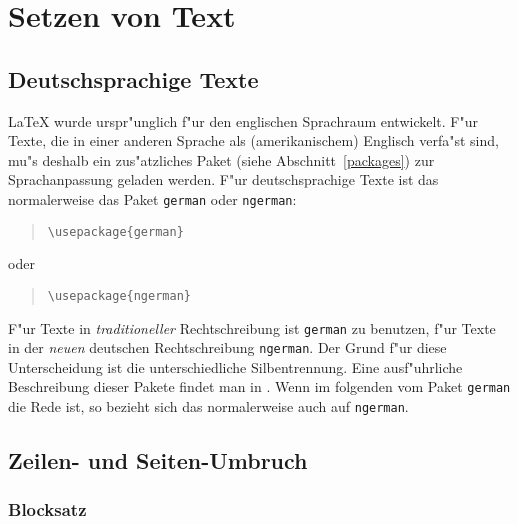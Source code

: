  
\section{Setzen von Text}
 

\subsection{Deutschsprachige Texte}\label{deutsch}
\LaTeX{} wurde urspr"unglich f"ur den englischen Sprachraum entwickelt.
F"ur Texte, die in einer anderen Sprache als (amerikanischem)
Englisch verfa"st sind, mu"s deshalb ein zus"atzliches Paket 
(siehe Abschnitt~\ref{packages}) zur Sprachanpassung geladen werden.  
F"ur deutschsprachige Texte ist das normalerweise das Paket \texttt{german} 
oder \texttt{ngerman}:
\begin{verse}
\verb:\usepackage{german}:
\end{verse}
oder
\begin{verse}
\verb:\usepackage{ngerman}:
\end{verse}
F"ur Texte in \emph{traditioneller} Rechtschreibung ist \texttt{german}
zu benutzen, f"ur Texte in der \emph{neuen} deutschen Rechtschreibung
\texttt{ngerman}.
Der Grund f"ur diese Unterscheidung ist die unterschiedliche Silbentrennung.
Eine ausf"uhrliche Beschreibung dieser Pakete findet man in \cite{germdoc}.  
Wenn im folgenden vom Paket \texttt{german} die Rede ist, 
so bezieht sich das normalerweise auch auf \texttt{ngerman}.


\subsection{Zeilen- und Seiten-Umbruch}
 
\newenvironment{specialparskip}{%
  \par
  \setlength{\parindent}{0pt}%
  \setlength{\parskip}{5pt plus 2pt minus 1pt}%
}{%
  \par
}
 
\subsubsection{Blocksatz}

